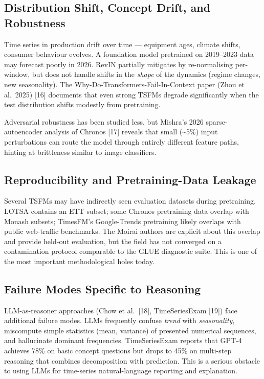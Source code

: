 \documentclass{article}
\begin{document}
\subsection{Distribution Shift, Concept Drift, and Robustness}\label{distribution-shift-concept-drift-and-robustness}

Time series in production drift over time --- equipment ages, climate shifts, consumer behaviour evolves. A foundation model pretrained on 2019--2023 data may forecast poorly in 2026. RevIN partially mitigates by re-normalising per-window, but does not handle shifts in the \emph{shape} of the dynamics (regime changes, new seasonality). The Why-Do-Transformers-Fail-In-Context paper (Zhou et al.~2025) {[}16{]} documents that even strong TSFMs degrade significantly when the test distribution shifts modestly from pretraining.

Adversarial robustness has been studied less, but Mishra's 2026 sparse-autoencoder analysis of Chronos {[}17{]} reveals that small (\textasciitilde5\%) input perturbations can route the model through entirely different feature paths, hinting at brittleness similar to image classifiers.

\subsection{Reproducibility and Pretraining-Data Leakage}\label{reproducibility-and-pretraining-data-leakage}

Several TSFMs may have indirectly seen evaluation datasets during pretraining. LOTSA contains an ETT subset; some Chronos pretraining data overlap with Monash subsets; TimesFM's Google-Trends pretraining likely overlaps with public web-traffic benchmarks. The Moirai authors are explicit about this overlap and provide held-out evaluation, but the field has not converged on a contamination protocol comparable to the GLUE diagnostic suite. This is one of the most important methodological holes today.

\subsection{Failure Modes Specific to Reasoning}\label{failure-modes-specific-to-reasoning}

LLM-as-reasoner approaches (Chow et al.~{[}18{]}, TimeSeriesExam {[}19{]}) face additional failure modes. LLMs frequently confuse \emph{trend} with \emph{seasonality}, miscompute simple statistics (mean, variance) of presented numerical sequences, and hallucinate dominant frequencies. TimeSeriesExam reports that GPT-4 achieves 78\% on basic concept questions but drops to 45\% on multi-step reasoning that combines decomposition with prediction. This is a serious obstacle to using LLMs for time-series natural-language reporting and explanation.
\end{document}
